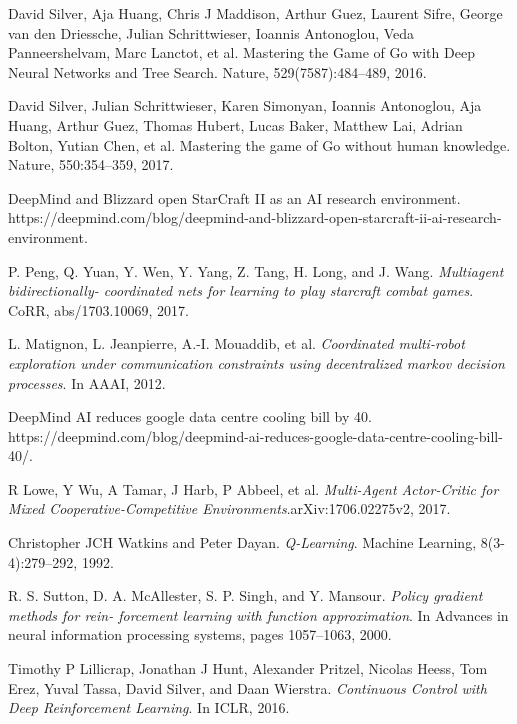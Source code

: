 \documentclass[11pt,twocolumn]{jarticle} %
\begin{document}
\begin{thebibliography}{9}

David Silver, Aja Huang, Chris J Maddison, Arthur Guez, Laurent Sifre, George van den Driessche, Julian Schrittwieser, Ioannis Antonoglou, Veda Panneershelvam, Marc Lanctot, et al. Mastering the Game of Go with Deep Neural Networks and Tree Search. Nature, 529(7587):484–489, 2016.

David Silver, Julian Schrittwieser, Karen Simonyan, Ioannis Antonoglou, Aja Huang, Arthur Guez, Thomas Hubert, Lucas Baker, Matthew Lai, Adrian Bolton, Yutian Chen, et al. Mastering the game of Go without human knowledge. Nature, 550:354–359, 2017.

DeepMind and Blizzard open StarCraft II as an AI research environment. https://deepmind.com/blog/deepmind-and-blizzard-open-starcraft-ii-ai-research-environment.

 P. Peng, Q. Yuan, Y. Wen, Y. Yang, Z. Tang, H. Long, and J. Wang. \textsl{Multiagent bidirectionally-
coordinated nets for learning to play starcraft combat games}. CoRR, abs/1703.10069, 2017.

L. Matignon, L. Jeanpierre, A.-I. Mouaddib, et al. \textsl{Coordinated multi-robot exploration under
communication constraints using decentralized markov decision processes}. In AAAI, 2012.

DeepMind AI reduces google data centre cooling bill by 40. https://deepmind.com/blog/deepmind-ai-reduces-google-data-centre-cooling-bill-40/.

R Lowe, Y Wu, A Tamar, J Harb, P Abbeel, et al. \textsl{Multi-Agent Actor-Critic for Mixed Cooperative-Competitive Environments}.arXiv:1706.02275v2, 2017.

Christopher JCH Watkins and Peter Dayan. \textsl{Q-Learning}. Machine Learning, 8(3-4):279–292, 1992.

R. S. Sutton, D. A. McAllester, S. P. Singh, and Y. Mansour. \textsl{Policy gradient methods for rein-
forcement learning with function approximation}. In Advances in neural information processing systems, pages 1057–1063, 2000.

Timothy P Lillicrap, Jonathan J Hunt, Alexander Pritzel, Nicolas Heess, Tom Erez, Yuval Tassa, David Silver, and Daan Wierstra. \textsl{Continuous Control with Deep Reinforcement Learning}. In ICLR, 2016.


\end{thebibliography}
\end{document}
